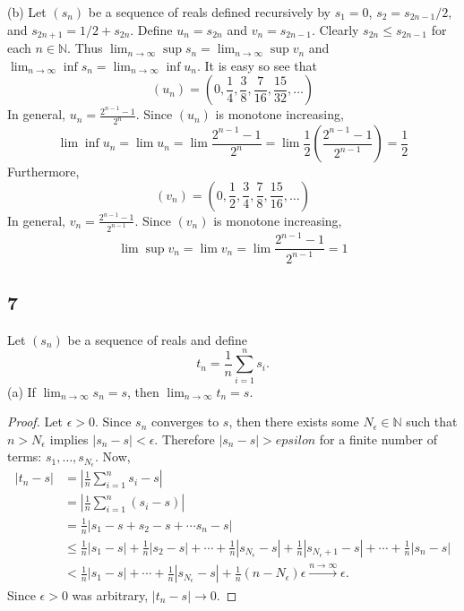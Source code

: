 \documentclass[11pt]{amsart}
\begin{document}
(b) Let $(s_{n})$ be a sequence of reals defined recursively by $s_{1} = 0$, $s_{2} = s_{2n-1} / 2$, and $s_{2n+1} = 1/2 + s_{2n}$. Define $u_{n} = s_{2n}$ and $v_{n} = s_{2n-1}$. Clearly $s_{2n} \leq s_{2n-1}$ for each $n\in \mathbb{N}$. Thus $\lim_{n\rightarrow \infty}\sup s_{n} = \lim_{n\rightarrow \infty}\sup v_{n}$ and $\lim_{n\rightarrow\infty}\inf s_{n} = \lim_{n\rightarrow \infty}\inf u_{n}$. It is easy so see that 
\[ (u_{n}) = \left( 0, \frac{1}{4}, \frac{3}{8}, \frac{7}{16}, \frac{15}{32}, \hdots \right) \]
In general, $u_{n} = \frac{2^{n-1} - 1}{2^{n}}$. Since $(u_{n})$ is monotone increasing, 
\[ \lim\inf u_{n} = \lim u_{n} = \lim \frac{2^{n-1} - 1}{2^{n}} = \lim \frac{1}{2}\left( \frac{2^{n-1} - 1}{2^{n-1}}\right) = \frac{1}{2} \]
Furthermore,
\[ (v_{n}) = \left( 0, \frac{1}{2}, \frac{3}{4}, \frac{7}{8}, \frac{15}{16}, \hdots \right) \]
In general, $v_{n} = \frac{2^{n-1} - 1}{2^{n-1}}$. Since $(v_{n})$ is monotone increasing, 
\[ \lim\sup v_{n} = \lim v_{n} = \lim \frac{2^{n-1} - 1}{2^{n-1}} = 1 \]

\subsection*{7} Let $(s_{n})$ be a sequence of reals and define 
\[ t_{n} = \frac{1}{n}\sum_{i=1}^{n} s_{i}.\]
(a) If $\lim_{n\rightarrow\infty}s_{n} = s$, then $\lim_{n\rightarrow\infty}t_{n} = s$.
\begin{proof}
  Let $\epsilon > 0$. Since $s_{n}$ converges to $s$, then there exists some $N_{\epsilon} \in \mathbb{N}$ such that $n > N_{\epsilon}$ implies $|s_{n} - s| < \epsilon$. Therefore $|s_{n} - s| > epsilon$ for a finite number of terms: $s_{1}, \hdots, s_{N_{\epsilon}}$. Now,
  \begin{align*}
    |t_{n} - s| & = \left| \frac{1}{n}\sum_{i=1}^{n}s_{i} - s\right| \\
    & = \left| \frac{1}{n}\sum_{i=1}^{n}(s_{i} - s)\right| \\
    & = \frac{1}{n}\left| s_{1} - s + s_{2} - s + \cdots s_{n} - s\right| \\
    & \leq \frac{1}{n}| s_{1} - s| + \frac{1}{n}|s_{2} - s| + \cdots + \frac{1}{n}|s_{N_{\epsilon}} - s| + \frac{1}{n}|s_{N_{\epsilon} + 1} - s| + \cdots + \frac{1}{n}|s_{n} - s| \\
    & < \frac{1}{n}|s_{1} - s| + \cdots + \frac{1}{n}|s_{N_{\epsilon}} - s| + \frac{1}{n}(n - N_{\epsilon}) \epsilon \stackrel{n\rightarrow\infty}{\longrightarrow} \epsilon.
  \end{align*}
  Since $\epsilon > 0$ was arbitrary, $|t_{n} - s| \longrightarrow 0$.
\end{proof}
\end{document}
